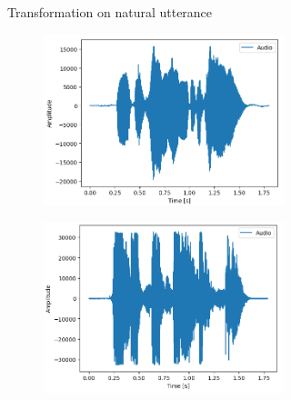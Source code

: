 \documentclass[11pt]{article}
\begin{document}
\begin{figure}
\begin{subfigure}{.5\textwidth}
\begin{subfigure}{.18\textwidth}
  \label{fig:sfig2}
\end{subfigure}
\caption{Transformation on natural utterance}
\end{subfigure}

\begin{subfigure}{.5\textwidth}
\begin{subfigure}{.18\textwidth}
  \centering
  \includegraphics[width=\linewidth]{"Bilder/art_neutral.png"}
  \label{fig:sfig1}
\end{subfigure}%
\begin{subfigure}{.18\textwidth}
  \centering
  \includegraphics[width=\linewidth]{Bilder/art_angry.png}
  \label{fig:sfig2}
\end{subfigure}
\begin{subfigure}{.18\textwidth}
  \centering

\end{subfigure}
\end{subfigure}
\end{figure}
\end{document}
